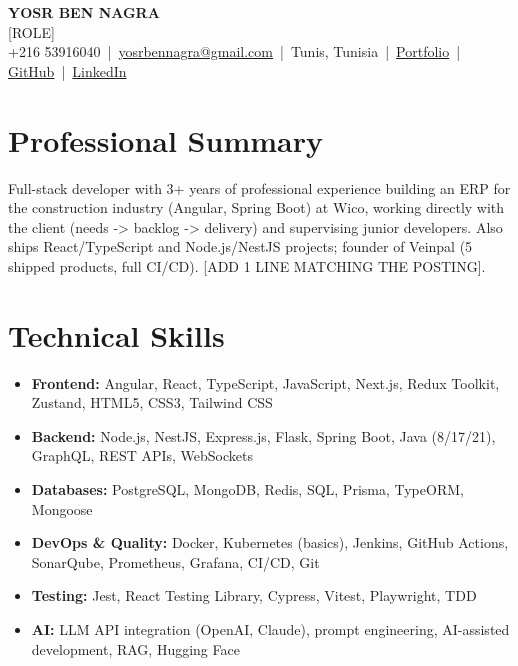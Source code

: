 \documentclass[10pt,a4paper]{article}
\begin{document}
{\huge\bfseries\color{navy} YOSR BEN NAGRA}\\[2pt]
{\large\color{gray} [ROLE]}\\[4pt]
{\small
  +216 53916040 \,|\, \href{mailto:yosrbennagra@gmail.com}{yosrbennagra@gmail.com} \,|\, Tunis, Tunisia \,|\,
  \href{https://portfolio-yosr.vercel.app/en}{Portfolio} \,|\,
  \href{https://github.com/YosrBennagra}{GitHub} \,|\,
  \href{https://www.linkedin.com/in/yosr-ben-nagra/}{LinkedIn}
}

\section*{Professional Summary}
{\small
Full-stack developer with 3+ years of professional experience building an ERP
for the construction industry (Angular, Spring Boot) at Wico, working directly
with the client (needs -> backlog -> delivery) and supervising junior developers.
Also ships React/TypeScript and Node.js/NestJS projects; founder of Veinpal
(5 shipped products, full CI/CD). [ADD 1 LINE MATCHING THE POSTING].
}

\section*{Technical Skills}
{\small
\begin{itemize}[leftmargin=0pt,label={},itemsep=1pt,topsep=1pt,parsep=0pt]
  \item \textbf{Frontend:} Angular, React, TypeScript, JavaScript, Next.js, Redux Toolkit, Zustand, HTML5, CSS3, Tailwind CSS
  \item \textbf{Backend:} Node.js, NestJS, Express.js, Flask, Spring Boot, Java (8/17/21), GraphQL, REST APIs, WebSockets
  \item \textbf{Databases:} PostgreSQL, MongoDB, Redis, SQL, Prisma, TypeORM, Mongoose
  \item \textbf{DevOps \& Quality:} Docker, Kubernetes (basics), Jenkins, GitHub Actions, SonarQube, Prometheus, Grafana, CI/CD, Git
  \item \textbf{Testing:} Jest, React Testing Library, Cypress, Vitest, Playwright, TDD
  \item \textbf{AI:} LLM API integration (OpenAI, Claude), prompt engineering, AI-assisted development, RAG, Hugging Face
\end{itemize}
}

\end{document}
